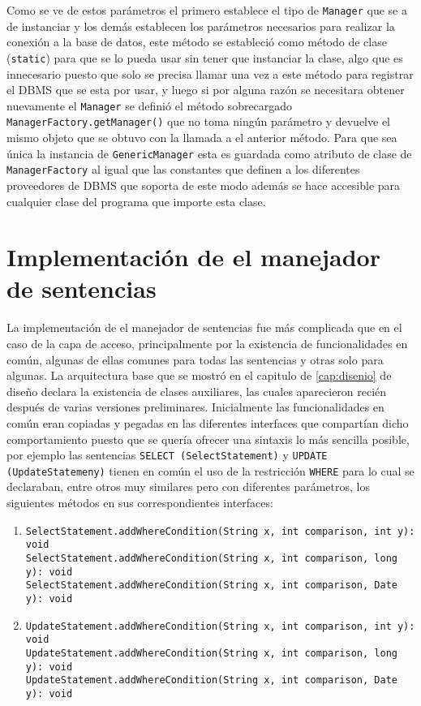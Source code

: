 Como se ve de estos parámetros el primero establece el tipo de \verb=Manager= que se a de instanciar y los demás establecen los parámetros necesarios para realizar la conexión a la base de datos, este método se estableció como método de clase (\verb=static=) para que se lo pueda usar sin tener que instanciar la clase, algo que es innecesario puesto que solo se precisa llamar una vez a este método para registrar el DBMS que se esta por usar, y luego si por alguna razón se necesitara obtener nuevamente el \verb=Manager= se definió el método sobrecargado \verb=ManagerFactory.getManager()= que no toma ningún parámetro y devuelve el mismo objeto que se obtuvo con la llamada a el anterior método. Para que sea única la instancia de \verb=GenericManager= esta es guardada como atributo de clase de \verb=ManagerFactory= al igual que las constantes que definen a los diferentes proveedores de DBMS que soporta \jj de este modo además se hace accesible para cualquier clase del programa que importe esta clase.
%
\section{Implementación de el manejador de sentencias}
La implementación de el manejador de sentencias fue más complicada que en el caso de la capa de acceso, principalmente por la existencia de funcionalidades en común, algunas de ellas comunes para todas las sentencias y otras solo para algunas. La arquitectura base que se mostró en el capitulo de \ref{cap:disenio} de diseño declara la existencia de clases auxiliares, las cuales aparecieron recién después de varias versiones preliminares. Inicialmente las funcionalidades en común eran copiadas y pegadas en las diferentes interfaces que compartían dicho comportamiento puesto que se quería ofrecer una sintaxis lo más sencilla posible, por ejemplo las sentencias \verb=SELECT (SelectStatement)= y \verb=UPDATE (UpdateStatemeny)= tienen en común el uso de la restricción \verb=WHERE= para lo cual se declaraban, entre otros muy similares pero con diferentes parámetros, los siguientes métodos en sus correspondientes interfaces:
%
\begin{enumerate}
\item \verb=SelectStatement.addWhereCondition(String x, int comparison, int y): void= \\
	\verb=SelectStatement.addWhereCondition(String x, int comparison, long y): void= \\
	\verb=SelectStatement.addWhereCondition(String x, int comparison, Date y): void= \\
\item \verb=UpdateStatement.addWhereCondition(String x, int comparison, int y): void= \\
	\verb=UpdateStatement.addWhereCondition(String x, int comparison, long y): void= \\
	\verb=UpdateStatement.addWhereCondition(String x, int comparison, Date y): void= \\
\end{enumerate}   
%

